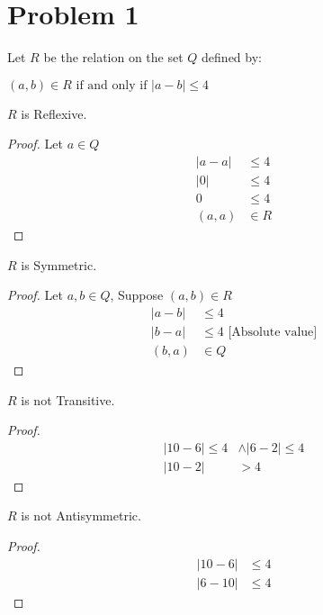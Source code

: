 \documentclass{article}
\newenvironment{problem}[1]{
  \nobreak\section*{Problem #1}
}{}
\begin{document}
  \begin{problem}{1}
    Let $R$ be the relation on the set $Q$ defined by:
    \begin{center}
      $(a, b) \in R \text{ if and only if } |a - b| \le 4$
    \end{center}
    
    $R$ is Reflexive.
    \begin{proof}
      Let $a \in Q$
      \begin{equation*}
        \begin{split}
          |a - a| & \le 4\\
          |0| & \le 4\\
          0 & \le 4\\
          (a, a) & \in R
        \end{split}
      \end{equation*}
    \end{proof}

    $R$ is Symmetric.
    \begin{proof}
      Let $a, b \in Q$, Suppose $(a, b) \in R$
      \begin{equation*}
        \begin{split}
          |a - b| & \le 4\\
          |b - a| & \le 4 \text{ [Absolute value]}\\
          (b, a) & \in Q 
        \end{split}
      \end{equation*}
    \end{proof}

    $R$ is not Transitive.
    \begin{proof}
      \begin{equation*}
        \begin{split}
          |10 - 6| \le 4 & \wedge |6 - 2| \le 4\\
          |10 - 2| & > 4
        \end{split}
      \end{equation*}
    \end{proof}

    $R$ is not Antisymmetric.
    \begin{proof}
      \begin{equation*}
        \begin{split}
          |10 - 6| & \le 4 \\
          |6 - 10| & \le 4
        \end{split}
      \end{equation*}
    \end{proof}
  \end{problem}
\end{document}

